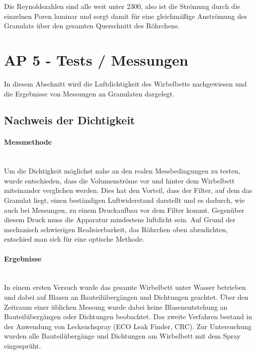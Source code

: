 Die Reynoldszahlen sind alle weit unter 2300, also ist die Strömung durch die einzelnen Poren laminar und sorgt damit für eine gleichmäßige Anströmung des Granulats über den gesamten Querschnitt des Röhrchens.

\newpage

\section{AP 5 - Tests / Messungen}

In diesem Abschnitt wird die Luftdichtigkeit des Wirbelbetts nachgewiesen und die Ergebnisse von Messungen an Granulaten dargelegt.

\subsection{Nachweis der Dichtigkeit}

\paragraph{Messmethode}
\hfill \\
Um die Dichtigkeit möglichst nahe an den realen Messbedingungen zu testen, wurde entschieden, dass die Volumenströme vor und hinter dem Wirbelbett miteinander verglichen werden. Dies hat den Vorteil, dass der Filter, auf dem das Granulat liegt, einen beständigen Luftwiderstand darstellt und es dadurch, wie auch bei Messungen, zu einem Druckaufbau vor dem Filter kommt. Gegenüber diesem Druck muss die Apparatur mindestens luftdicht sein. Auf Grund der mechanisch schwierigen Realisierbarkeit, das Röhrchen oben abzudichten, entschied man sich für eine optische Methode.

\paragraph{Ergebnisse}
\hfill \\

In einem ersten Versuch wurde das gesamte Wirbelbett unter Wasser betrieben und dabei auf Blasen an Bauteilübergängen und Dichtungen geachtet. Über den Zeitraum einer üblichen Messung wurde dabei keine Blasenentstehung an Bauteilübergängen oder Dichtungen beobachtet. 
Das zweite Verfahren bestand in der Anwendung von Lecksuchspray (ECO Leak Finder, CRC). Zur Untersuchung wurden alle Bauteilübergänge und Dichtungen am Wirbelbett mit dem Spray eingesprüht. 


